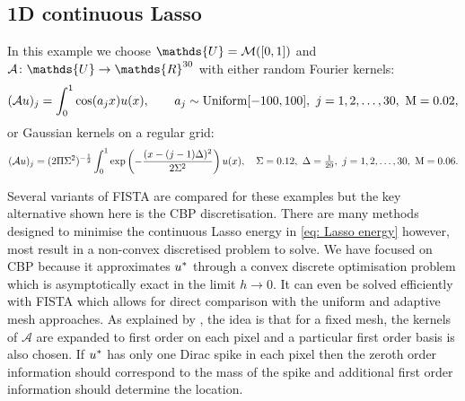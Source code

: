 \documentclass[10pt,a4paper,onecolumn]{article}
\numberwithin{equation}{section}
\let\F\mathds\let\C\mathcal\newcommand{\R}{\F{R}}\newcommand{\A}{\C{A}}
\newcommand{\op}[1]{\operatorname{#1}}\newcommand{\overtext}[2]{\stackrel{\text{#1}}{#2}}
\newcommand*{\varf}[1]{%
	\IfEqCase{#1}{%
		{0}{u}%
		{1}{v}%
		{2}{w}%
	}[u#1]%
}
\newcommand*{\spcf}[1]{%
	\IfEqCase{#1}{%
		{0}{\F{U}}%
		{1}{\F{V}}%
		{2}{\F{W}}%
	}[\F{U}#1]%
}
\newcommand*{\varx}[1]{%
	\IfEqCase{#1}{%
		{0}{x}%
		{1}{y}%
		{2}{z}%
		{3}{r}%
	}[x#1]%
}
\newcommand*{\vars}[1]{%
	\IfEqCase{#1}{%
		{0}{\alpha}%
		{1}{\beta}%
		{2}{\gamma}%
		{3}{a}%
		{4}{b}%
		{5}{c}%
	}[k#1]%
}
\newcommand{\meshsize}{h}
\begin{document}
\subsection{1D continuous Lasso}\label{sec: 1D Lasso examples}
In this example we choose $\spcf0=\C M([0,1])$ and $\A\colon \spcf0\to \R^{30}$ with either random Fourier kernels:
\begin{equation}
	(\A\varf0)_j = \int_0^1\cos(\vars3_j\varx0)\varf0(\varx0), \qquad \vars3_j\sim \op{Uniform}[-100,100],\ j=1,2,\ldots,30,\ \mu =0.02, 
\end{equation}
or Gaussian kernels on a regular grid:
\begin{equation}
	(\A\varf0)_j = (2\pi\sigma^2)^{-\frac12}\int_0^1\exp\left(-\frac{(\varx0-(j-1)\Delta)^2}{2\sigma^2}\right)\varf0(\varx0), \quad \sigma=0.12,\ \Delta = \tfrac1{29},\ j=1,2,\ldots,30,\ \mu=0.06.
\end{equation}

Several variants of FISTA are compared for these examples but the key alternative shown here is the CBP discretisation. There are many methods designed to minimise the continuous Lasso energy in \eqref{eq: Lasso energy} \citep[c.f.][]{Bredies2013,Castro2016,Boyd2017,Catala2019} however, most result in a non-convex discretised problem to solve. We have focused on CBP because it approximates $\varf0^*$ through a convex discrete optimisation problem which is asymptotically exact in the limit $\meshsize\to0$. It can even be solved efficiently with FISTA which allows for direct comparison with the uniform and adaptive mesh approaches. As explained by \citep{Ekanadham2011, Duval2017b}, the idea is that for a fixed mesh, the kernels of $\A$ are expanded to first order on each pixel and a particular first order basis is also chosen. If $\varf0^*$ has only one Dirac spike in each pixel then the zeroth order information should correspond to the mass of the spike and additional first order information should determine the location.
\end{document}
